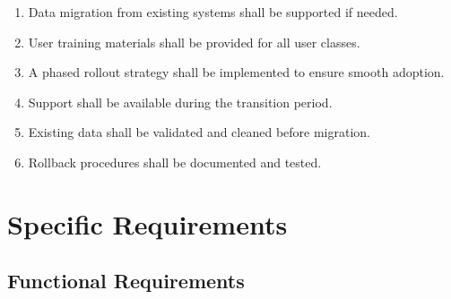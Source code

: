 \documentclass[12pt,a4paper]{article}
\begin{document}
\begin{enumerate}[leftmargin=*, label=\textbf{TR-\arabic*.}, itemsep=4pt]
  \item Data migration from existing systems shall be supported if needed.
  \item User training materials shall be provided for all user classes.
  \item A phased rollout strategy shall be implemented to ensure smooth adoption.
  \item Support shall be available during the transition period.
  \item Existing data shall be validated and cleaned before migration.
  \item Rollback procedures shall be documented and tested.
\end{enumerate}
\newpage

\newpage
\section{Specific Requirements}

\subsection{Functional Requirements}
\end{document}
